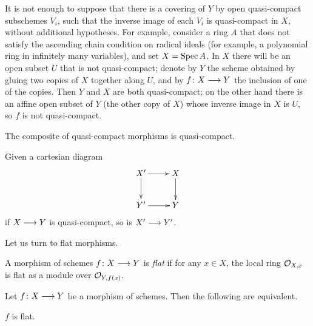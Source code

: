 \begin{1   PRELIMINARY NOTIONS}
\begin{1.1 Algebraic geometry}
\begin{remark}
It is not enough to suppose that there is a covering of $Y$ by open quasi-compact subschemes $V_i$, such that the inverse image of each $V_i$ is quasi-compact in $X$, without additional hypotheses. For example, consider a ring $A$ that does not satisfy the ascending chain condition on radical ideals (for example, a polynomial ring in infinitely many variables), and set $X = \operatorname{Spec} A$. In $X$ there will be an open subset $U$ that is not quasi-compact; denote by $Y$ the scheme obtained by gluing two copies of $X$ together along $U$, and by $f \colon X \arr Y$ the inclusion of one of the copies. Then $Y$ and $X$ are both quasi-compact; on the other hand there is an affine open subset of $Y$ (the other copy of $X$) whose inverse image in $X$ is $U$, so $f$ is not quasi-compact.
\end{remark}



\begin{proposition}\hfil

\begin{enumeratei}

\item The composite of quasi-compact morphisms is quasi-compact.

\item Given a cartesian diagram
   \[
   \xymatrix{
   X'\ar[r]\ar[d] & X\ar[d] \\
   Y' \ar[r] & Y
   }
   \]
if $X \arr Y$ is quasi-compact, so is $X' \arr Y'$.
\end{enumeratei}

\end{proposition}

Let us turn to flat morphisms. 

\begin{definition}
A morphism of schemes $f \colon X \arr Y$ is \emph{flat} if for any $x \in X$, the local ring $\mathcal{O}_{X,x}$ is flat as a module over
$\mathcal{O}_{Y, f(x)}$.
\end{definition}

\begin{proposition}
Let $f \colon X \arr Y$ be a morphism of schemes. Then the following are equivalent.
\begin{enumeratei}

\item $f$ is flat.


\end{enumeratei}
\end{proposition}
\end{1.1 Algebraic geometry}
\end{1   PRELIMINARY NOTIONS}
